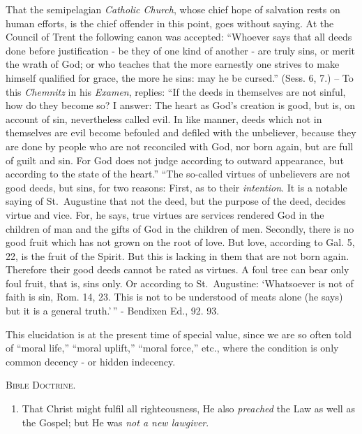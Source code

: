 \documentclass[
]{book}
\providecommand{\tightlist}{%
  \setlength{\itemsep}{0pt}\setlength{\parskip}{0pt}}
\begin{document}
That the semipelagian \emph{Catholic Church}, whose chief hope of salvation rests on human efforts, is the chief offender in this point, goes without saying. At the Council of Trent the following canon was accepted: ``Whoever says that all deeds done before justification - be they of one kind of another - are truly sins, or merit the wrath of God; or who teaches that the more earnestly one strives to make himself qualified for grace, the more he sins: may he be cursed.'' (Sess. 6, 7.) -- To this \emph{Chemnitz} in his \emph{Examen}, replies: ``If the deeds in themselves are not sinful, how do they become so? I answer: The heart as God's creation is good, but is, on account of sin, nevertheless called evil. In like manner, deeds which not in themselves are evil become befouled and defiled with the unbeliever, because they are done by people who are not reconciled with God, nor born again, but are full of guilt and sin. For God does not judge according to outward appearance, but according to the state of the heart.'' ``The so-called virtues of unbelievers are not good deeds, but sins, for two reasons: First, as to their \emph{intention}. It is a notable saying of St.~Augustine that not the deed, but the purpose of the deed, decides virtue and vice. For, he says, true virtues are services rendered God in the children of man and the gifts of God in the children of men. Secondly, there is no good fruit which has not grown on the root of love. But love, according to Gal. 5, 22, is the fruit of the Spirit. But this is lacking in them that are not born again. Therefore their good deeds cannot be rated as virtues. A foul tree can bear only foul fruit, that is, sins only. Or according to St.~Augustine: `Whatsoever is not of faith is sin, Rom. 14, 23. This is not to be understood of meats alone (he says) but it is a general truth.'\,'' - Bendixen Ed., 92. 93.

This elucidation is at the present time of special value, since we are so often told of ``moral life,'' ``moral uplift,'' ``moral force,'' etc., where the condition is only common decency - or hidden indecency.

\begin{center}
\textsc{Bible Doctrine.}
\end{center}

\begin{enumerate}
\def\labelenumi{\alph{enumi}.}
\setcounter{enumi}{2}
\tightlist
\item
  That Christ might fulfil all righteousness, He also \emph{preached} the Law as well as the Gospel; but He was \emph{not a new lawgiver}.
\end{enumerate}
\end{document}

